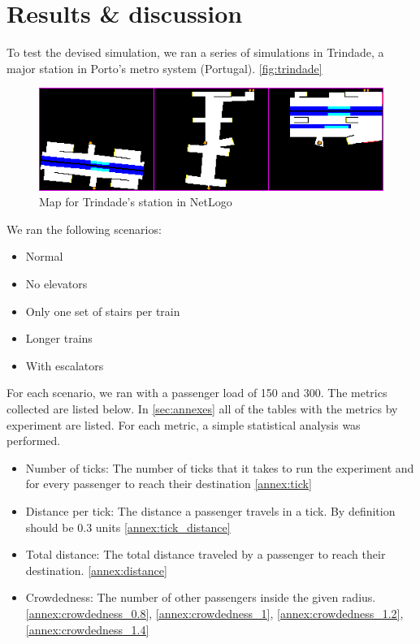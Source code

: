 
\section{Results \& discussion}\label{sec:results_discussion}

To test the devised simulation, we ran a series of simulations in Trindade, a major station in Porto's metro system (Portugal). \autoref{fig:trindade} \\

\begin{figure}
    \centering
    \includegraphics[width=\linewidth]{assets/trindade.png}
    \caption{Map for Trindade's station in NetLogo}
    \label{fig:trindade}
\end{figure}

We ran the following scenarios:

\begin{itemize}
    \item Normal
    \item No elevators
    \item Only one set of stairs per train
    \item Longer trains
    \item With escalators
\end{itemize}

For each scenario, we ran with a passenger load of 150 and 300. The metrics collected are listed below. In \autoref{sec:annexes} all of the tables with the metrics by experiment are listed. For each metric, a simple statistical analysis was performed.
\begin{itemize}
    \item Number of ticks: The number of ticks that it takes to run the experiment and for every passenger to reach their destination \ref{annex:tick}
    \item Distance per tick: The distance a passenger travels in a tick. By definition should be 0.3 units \ref{annex:tick_distance}
    \item Total distance: The total distance traveled by a passenger to reach their destination.  \ref{annex:distance}
    \item Crowdedness: The number of other passengers inside the given radius. \ref{annex:crowdedness_0.8}, \ref{annex:crowdedness_1}, \ref{annex:crowdedness_1.2}, \ref{annex:crowdedness_1.4}
\end{itemize}

